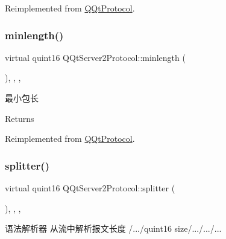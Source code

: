 Reimplemented from \mbox{\hyperlink{class_q_qt_protocol_af41bc3116abbbcfc9af45e151a253ff7}{Q\+Qt\+Protocol}}.

\mbox{\label{class_q_qt_server2_protocol_a2282032c0edf8f9d93471125de77a980}} 
\subsubsection{\texorpdfstring{minlength()}{minlength()}}
{\footnotesize\ttfamily virtual quint16 Q\+Qt\+Server2\+Protocol\+::minlength (\begin{DoxyParamCaption}{ }\end{DoxyParamCaption})\hspace{0.3cm}{\ttfamily [inline]}, {\ttfamily [override]}, {\ttfamily [protected]}, {\ttfamily [virtual]}}



最小包长 

\begin{DoxyReturn}{Returns}

\end{DoxyReturn}


Reimplemented from \mbox{\hyperlink{class_q_qt_protocol_a2b00f53d3dd0eed817eeecff422891f3}{Q\+Qt\+Protocol}}.

\mbox{\label{class_q_qt_server2_protocol_a764cdc712de1104ae9400633eabd2f17}} 
\subsubsection{\texorpdfstring{splitter()}{splitter()}}
{\footnotesize\ttfamily virtual quint16 Q\+Qt\+Server2\+Protocol\+::splitter (\begin{DoxyParamCaption}\item[{const Q\+Byte\+Array \&}]{ }\end{DoxyParamCaption})\hspace{0.3cm}{\ttfamily [inline]}, {\ttfamily [override]}, {\ttfamily [protected]}, {\ttfamily [virtual]}}



语法解析器 从流中解析报文长度 /.../quint16 size/.../.../... 


